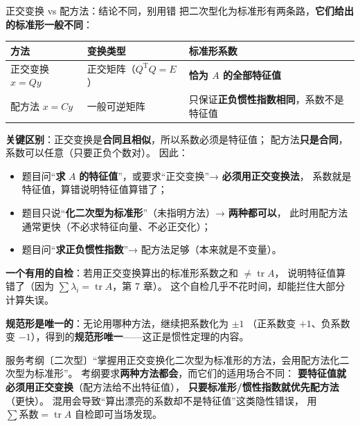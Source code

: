 

\begin{fdeep}{正交变换 vs 配方法：结论不同，别用错}
把二次型化为标准形有两条路，\textbf{它们给出的标准形一般不同}：

\begin{center}
\begin{tabular}{@{}lll@{}}
\toprule
方法 & 变换类型 & 标准形系数 \\
\midrule
正交变换 $x=Qy$ & 正交矩阵（$Q^{\mathrm T}Q=E$） & \textbf{恰为 $A$ 的全部特征值} \\
配方法 $x=Cy$ & 一般可逆矩阵 & 只保证\textbf{正负惯性指数相同}，系数不是特征值 \\
\bottomrule
\end{tabular}
\end{center}

\textbf{关键区别}：正交变换是\textbf{合同且相似}，所以系数必须是特征值；
配方法\textbf{只是合同}，系数可以任意（只要正负个数对）。
因此：
\begin{itemize}[leftmargin=2.2em,itemsep=0.22em]
\item 题目问“\textbf{求 }$A$\textbf{ 的特征值}”，或要求“正交变换”→ \textbf{必须用正交变换法}，
      系数就是特征值，算错说明特征值算错了；
\item 题目只说“\textbf{化二次型为标准形}”（未指明方法）→ \textbf{两种都可以}，
      此时用配方法通常更快（不必求特征向量、不必正交化）；
\item 题目问“\textbf{求正负惯性指数}”→ 配方法足够（本来就是不变量）。
\end{itemize}
\textbf{一个有用的自检}：若用正交变换算出的标准形系数之和 $\ne\operatorname{tr}A$，
说明特征值算错了（因为 $\sum\lambda_i=\operatorname{tr}A$，第 7 章）。
这个自检几乎不花时间，却能拦住大部分计算失误。

\textbf{规范形是唯一的}：无论用哪种方法，继续把系数化为 $\pm1$
（正系数变 $+1$、负系数变 $-1$），得到的\textbf{规范形唯一}——这正是惯性定理的内容。

\fbref{}服务考纲〔二次型〕“掌握用正交变换化二次型为标准形的方法，会用配方法化二次型为标准形”。
考纲要求\textbf{两种方法都会}，而它们的适用场合不同：
\textbf{要特征值就必须用正交变换}（配方法给不出特征值），
\textbf{只要标准形/惯性指数就优先配方法}（更快）。
混用会导致“算出漂亮的系数却不是特征值”这类隐性错误，
用 $\sum\text{系数}=\operatorname{tr}A$ 自检即可当场发现。
\end{fdeep}

